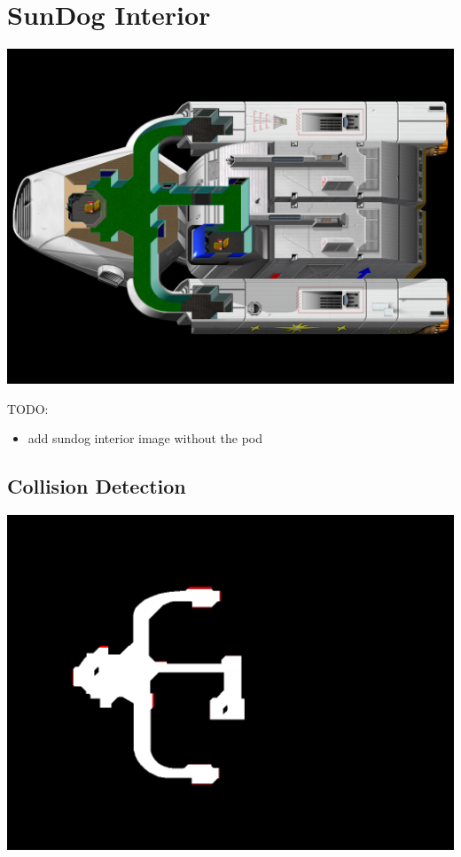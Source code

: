 \section{SunDog Interior}

\includegraphics[scale=0.35]{images/sundog-interior-with-pod.png}



TODO:
\begin{itemize}
\item add sundog interior image without the pod
\end{itemize}

\subsection{Collision Detection}

\includegraphics[scale=0.35]{images/sundog-interior-with-pod-collidemap.png}

